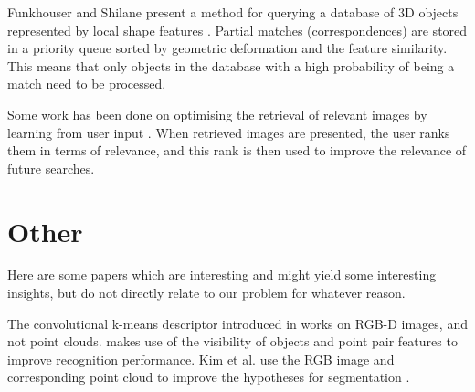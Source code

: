 \documentclass[10pt,a4paper]{article}
\begin{document}
Funkhouser and Shilane present a method for querying a database of 3D objects
represented by local shape features \cite{funkhouser2006partial}. Partial
matches (correspondences) are stored in a priority queue sorted by geometric
deformation and the feature similarity. This means that only objects in the
database with a high probability of being a match need to be processed.

Some work has been done on optimising the retrieval of relevant images by
learning from user input \cite{rui2000optimizing}. When retrieved images are
presented, the user ranks them in terms of relevance, and this rank is then used
to improve the relevance of future searches.

\section{Other}
Here are some papers which are interesting and might yield some interesting
insights, but do not directly relate to our problem for whatever reason.

The convolutional k-means descriptor introduced in \cite{blum2012learned} works
on RGB-D images, and not point clouds. \cite{kim20113d} makes use of the
visibility of objects and point pair features to improve recognition
performance. Kim et al. use the RGB image and corresponding point
cloud to improve the hypotheses for segmentation \cite{kim2013accurate}.

\printbibliography
\end{document}
